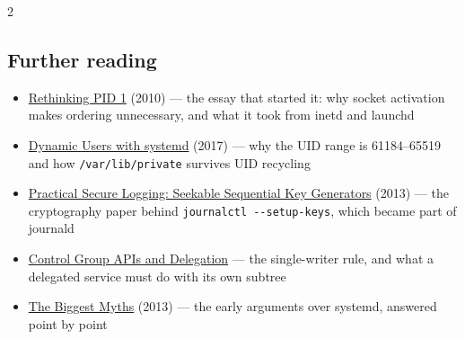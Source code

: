 \documentclass[8pt]{extarticle}
\newcommand\ct[1]{\texttt{#1}}
\newcommand\dd{\hbox{-}\hbox{-}}          %
\newcommand\hd[1]{\par\vspace{2pt}\noindent{\small\bfseries\color{sheetBlue}#1}\par\vspace{1pt}}
\begin{document}
\begin{multicols}{2}
\hd{Releases}
\noindent{}

\begin{htmlonly}
\section{Further reading}
\begin{itemize}
  \item \href{https://0pointer.de/blog/projects/systemd.html}{Rethinking PID 1} (2010) — the essay
        that started it: why socket activation makes ordering unnecessary, and what it took from
        inetd and launchd
  \item \href{https://0pointer.net/blog/dynamic-users-with-systemd.html}{Dynamic Users with systemd}
        (2017) — why the UID range is 61184–65519 and how \texttt{/var/lib/private} survives UID recycling
  \item \href{https://eprint.iacr.org/2013/397}{Practical Secure Logging: Seekable Sequential Key Generators}
        (2013) — the cryptography paper behind \ct{journalctl \dd setup-keys}, which became part of journald
  \item \href{https://systemd.io/CGROUP_DELEGATION/}{Control Group APIs and Delegation} — the
        single-writer rule, and what a delegated service must do with its own subtree
  \item \href{https://0pointer.de/blog/projects/the-biggest-myths.html}{The Biggest Myths} (2013) —
        the early arguments over systemd, answered point by point
\end{itemize}
\end{htmlonly}

\end{multicols}
\end{document}
